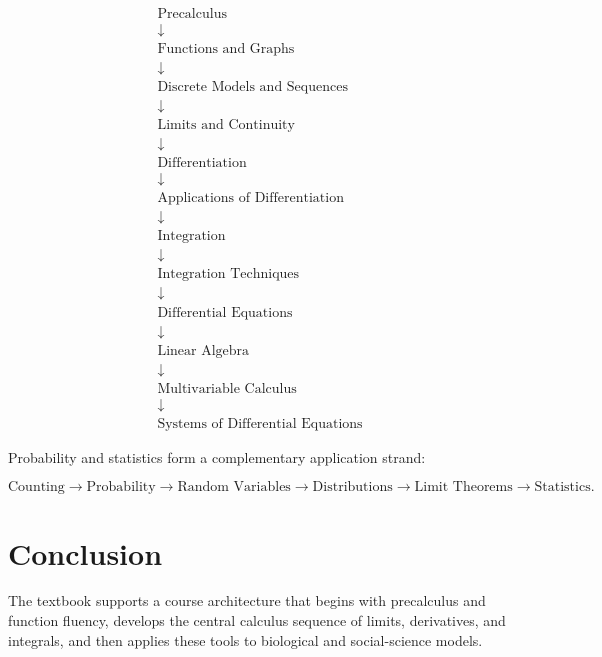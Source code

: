 \documentclass[11pt]{article}
\begin{document}
\[
\boxed{
\begin{array}{c}
\text{Precalculus}
\\
\downarrow
\\
\text{Functions and Graphs}
\\
\downarrow
\\
\text{Discrete Models and Sequences}
\\
\downarrow
\\
\text{Limits and Continuity}
\\
\downarrow
\\
\text{Differentiation}
\\
\downarrow
\\
\text{Applications of Differentiation}
\\
\downarrow
\\
\text{Integration}
\\
\downarrow
\\
\text{Integration Techniques}
\\
\downarrow
\\
\text{Differential Equations}
\\
\downarrow
\\
\text{Linear Algebra}
\\
\downarrow
\\
\text{Multivariable Calculus}
\\
\downarrow
\\
\text{Systems of Differential Equations}
\end{array}
}
\]

Probability and statistics form a complementary application strand:

\[
\boxed{
\text{Counting}
\rightarrow
\text{Probability}
\rightarrow
\text{Random Variables}
\rightarrow
\text{Distributions}
\rightarrow
\text{Limit Theorems}
\rightarrow
\text{Statistics}.
}
\]


\section{Conclusion}

The textbook supports a course architecture that begins with
precalculus and function fluency, develops the central calculus
sequence of limits, derivatives, and integrals, and then applies
these tools to biological and social-science models.
\end{document}
